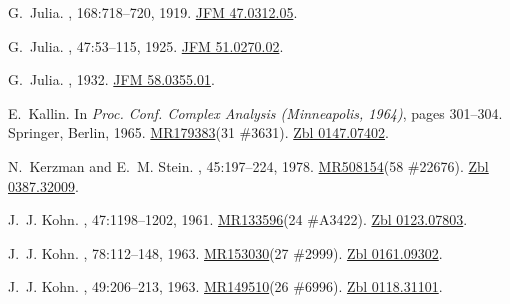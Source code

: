 \documentclass[11pt,a4paper, final, twoside]{article}
\numberwithin{equation}{section}
\begin{document}
\begin{appendices}
\begin{thebibliography}{100}
G.~Julia.
, 168:718--720, 1919.
\newblock \href{http://zbmath.org/?q=an:47.0312.05}{JFM 47.0312.05}.

G.~Julia.
, 47:53--115, 1925.
\newblock \href{http://zbmath.org/?q=an:51.0270.02}{JFM 51.0270.02}.

G.~Julia.
,
  1932.
\newblock \href{http://zbmath.org/?q=an:58.0355.01}{JFM 58.0355.01}.

E.~Kallin.
\newblock In {\em Proc. {C}onf. {C}omplex {A}nalysis ({M}inneapolis, 1964)},
  pages 301--304. Springer, Berlin, 1965.
\newblock \href{http://www.ams.org/mathscinet-getitem?mr=179383}{MR179383}(31
  \#3631). \href{http://zbmath.org/?q=an:0147.07402}{Zbl 0147.07402}.

N.~Kerzman and E.~M. Stein.
, 45:197--224, 1978.
\newblock \href{http://www.ams.org/mathscinet-getitem?mr=508154}{MR508154}(58
  \#22676). \href{http://zbmath.org/?q=an:0387.32009}{Zbl 0387.32009}.

J.~J. Kohn.
, 47:1198--1202, 1961.
\newblock \href{http://www.ams.org/mathscinet-getitem?mr=133596}{MR133596}(24
  \#A3422). \href{http://zbmath.org/?q=an:0123.07803}{Zbl 0123.07803}.

J.~J. Kohn.
, 78:112--148, 1963.
\newblock \href{http://www.ams.org/mathscinet-getitem?mr=153030}{MR153030}(27
  \#2999). \href{http://zbmath.org/?q=an:0161.09302}{Zbl 0161.09302}.

J.~J. Kohn.
, 49:206--213, 1963.
\newblock \href{http://www.ams.org/mathscinet-getitem?mr=149510}{MR149510}(26
  \#6996). \href{http://zbmath.org/?q=an:0118.31101}{Zbl 0118.31101}.


\end{thebibliography}
\end{appendices}
\end{document}
